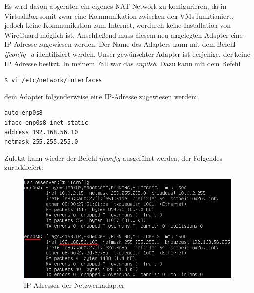 Es wird davon abgeraten ein eigenes NAT-Network zu konfigurieren, da in VirtualBox somit zwar eine Kommunikation zwischen den VMs funktioniert, jedoch keine Kommunikation zum Internet, wordurch keine Installation von WireGuard möglich ist. \newpage \noindent
Anschließend muss diesem neu angelegten Adapter eine IP-Adresse zugewiesen werden. Der Name des Adapters kann mit dem Befehl \textit{ifconfig -a} identifiziert werden. Unser gewünschter Adapter ist derjenige, der keine IP Adresse besitzt. In meinem Fall war das \textit{enp0s8}. Dazu kann mit dem Befehl 
\begin{lstlisting}
$ vi /etc/network/interfaces
\end{lstlisting}
dem Adapter folgenderweise eine IP-Adresse zugewiesen werden:
\begin{lstlisting}
auto enp0s8
iface enp0s8 inet static
address 192.168.56.10
netmask 255.255.255.0
\end{lstlisting}
Zuletzt kann wieder der Befehl \textit{ifconfig} ausgeführt werden, der Folgendes zurückliefert:
\begin{figure}[H]
  \centering
  \includegraphics[scale=0.7]{images/ifconfig.PNG}
  \caption{IP Adressen der Netzwerkadapter}
\end{figure} \noindent
